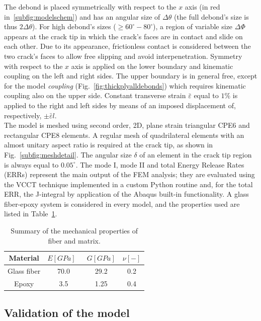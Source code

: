 \documentclass[review]{elsarticle}
\begin{document}
The debond is placed symmetrically with respect to the $x$ axis (in red in~\ref{subfig:modelschem}) and has an angular size of $\Delta\theta$ (the full debond's size is thus $2\Delta\theta$). For high debond's sizes ($\geq 60^{\circ}-80^{\circ}$), a region of variable size $\Delta\Phi$ appears at the crack tip in which the crack's faces are in contact and slide on each other. Due to its appearance, frictionless contact is considered between the two crack's faces to allow free slipping and avoid interpenetration. Symmetry with respect to the $x$ axis is applied on the lower boundary and kinematic coupling on the left and right sides. The upper boundary is in general free, except for the model \textit{coupling} (Fig.~\ref{fig:thickplyalldebonds}) which requires kinematic coupling also on the upper side. Constant transverse strain $\bar{\varepsilon}$ equal to $1\%$ is applied to the right and left sides by means of an imposed displacement of, respectively, $\pm\bar{\varepsilon}l$.\\
The model is meshed using second order, 2D, plane strain triangular CPE6 and rectangular CPE8 elements. A regular mesh of quadrilateral elements with an almost unitary aspect ratio is required at the crack tip, as shown in Fig.~\ref{subfig:meshdetail}. The angular size $\delta$ of an element in the crack tip region is always equal to $0.05^{\circ}$. The mode I, mode II and total Energy Release Rates (ERRs) represent the main output of the FEM analysis; they are evaluated using the VCCT technique implemented in a custom Python routine and, for the total ERR, the J-integral by application of the Abaqus built-in functionality. A glass fiber-epoxy system is considered in every model, and the properties used are listed in Table~\ref{tab:phaseprop}.

\begin{table}[htbp]
 \centering
 \caption{Summary of the mechanical properties of fiber and matrix.}
 \begin{tabular}{cccc}
\textbf{Material} & \textbf{$E\left[GPa\right]$}\ & \textbf{$G\left[GPa\right]$} & \textbf{$\nu\left[-\right]$} \\
\midrule
Glass fiber    & 70.0  & 29.2   & 0.2  \\
Epoxy    & 3.5    & 1.25   & 0.4  
\end{tabular}
\label{tab:phaseprop}
\end{table}

\subsection{Validation of the model}
\end{document}

